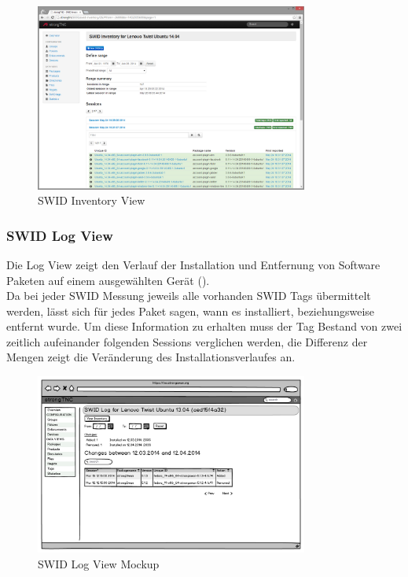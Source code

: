 \begin{figure}[H]
	\centering
	\includegraphics[width=0.8\textwidth]{./images/Views/inventory-view}
	\caption{SWID Inventory View}
	\label{fig:swid-inventory-view}
\end{figure}


\subsubsection{SWID Log View}
Die Log View zeigt den Verlauf der Installation und Entfernung von Software
Paketen auf einem ausgewählten Gerät ().\\
Da bei jeder SWID Messung jeweils alle vorhanden SWID Tags übermittelt werden,
lässt sich für jedes Paket sagen, wann es installiert, beziehungsweise entfernt
wurde. Um diese Information zu erhalten muss der Tag Bestand von zwei zeitlich
aufeinander folgenden Sessions verglichen werden, die Differenz der Mengen zeigt
die Veränderung des Installationsverlaufes an.

\begin{figure}[H]
	\centering
	\includegraphics[width=0.8\textwidth]{./images/mockups/swid-log}
	\caption{SWID Log View Mockup}
	\label{fig:swid-log}
\end{figure}

